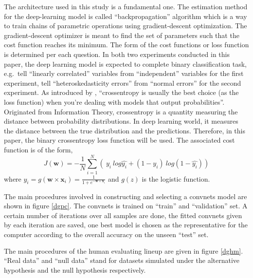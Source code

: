 \documentclass[12pt]{article}
\begin{document}
The architecture used in this study is a fundamental one. The estimation
method for the deep-learning model is called ``backpropagation''
algorithm which is a way to train chains of parametric operations using
gradient-descent optimization. The gradient-descent optimizer is meant
to find the set of parameters such that the cost function reaches its
minimum. The form of the cost functions or loss function is determined
per each question. In both two experiments conducted in this paper, the
deep learning model is expected to complete binary classification task,
e.g.~tell ``linearly correlated'' variables from ``independent''
variables for the first experiment, tell ``heteroskedasticity errors''
from ``normal errors'' for the second experiment. As introduced by
\citet{DLR18}, ``crossentropy is usually the best choice (as the loss
function) when you're dealing with models that output probabilities''.
Originated from Information Theory, crossentropy is a quantity measuring
the distance between probability distributions. In deep learning world,
it measures the distance between the true distribution and the
predictions. Therefore, in this paper, the binary crossentropy loss
function will be used. The associated cost function is of the form,
\[J(\textbf{w})=- \frac{1}{N}\sum_{i=1}^N\left(  
\ y_i\ log\hat{y_i}+(1-y_i)\ log(1-\hat{y_i})  
\right)\] where
\(\hat{y_i} = g(\textbf{w} \times \textbf{x}_i) = \frac{1}{1+e^{-\textbf{w} \times \textbf{x}_i}}\)
and \(g(z)\) is the logistic function.

The main procedures involved in constructing and selecting a convnets
model are shown in figure \ref{dgpc}. The convnets is trained on
``train'' and ``validation'' set. A certain number of iterations over
all samples are done, the fitted convnets given by each iteration are
saved, one best model is chosen as the representative for the computer
according to the overall accuracy on the unseen ``test'' set.

The main procedures of the human evaluating lineup are given in figure
\ref{dghm}. ``Real data'' and ``null data'' stand for datasets simulated
under the alternative hypothesis and the null hypothesis respectively.
\end{document}
